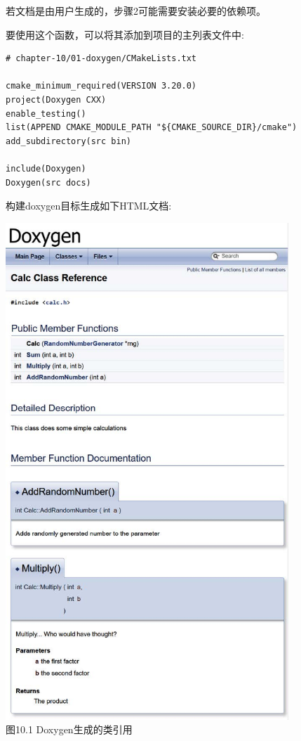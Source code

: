若文档是由用户生成的，步骤2可能需要安装必要的依赖项。

要使用这个函数，可以将其添加到项目的主列表文件中:

\begin{lstlisting}[style=styleCMake]
# chapter-10/01-doxygen/CMakeLists.txt

cmake_minimum_required(VERSION 3.20.0)
project(Doxygen CXX)
enable_testing()
list(APPEND CMAKE_MODULE_PATH "${CMAKE_SOURCE_DIR}/cmake")
add_subdirectory(src bin)

include(Doxygen)
Doxygen(src docs)
\end{lstlisting}

构建doxygen目标生成如下HTML文档:

\begin{center}
\includegraphics[width=0.8\textwidth]{content/3/chapter10/images/1.jpg}\\
图10.1 Doxygen生成的类引用
\end{center}


